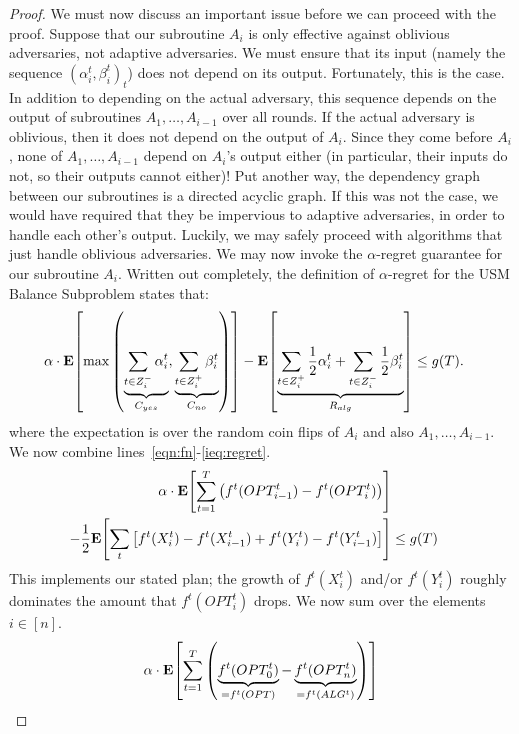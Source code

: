 \documentclass[final,12pt]{colt2018}
\newcommand{\BalanceSubproblem}{USM Balance Subproblem}
\newcommand{\Yes}[1][i]{Z^+_{#1}}
\newcommand{\No}[1][i]{Z^-_{#1}}
\newcommand{\RewardAlg}{R_{alg}}
\newcommand{\CostYes}{C_{yes}}
\newcommand{\CostNo}{C_{no}}
\newcommand{\expect}[2][]{\mathbf{E}\ifthenelse{\not\equal{}{#1}}{_{#1}}{}\!\left[#2\right]}
\begin{document}
\begin{proof}
  We must now discuss an important issue before we can proceed with the proof. Suppose that our subroutine $A_i$ is only effective against oblivious adversaries, not adaptive adversaries. We must ensure that its input (namely the sequence $(\alpha^t_i, \beta^t_i)_t$) does not depend on its output. Fortunately, this is the case. In addition to depending on the actual adversary, this sequence depends on the output of subroutines $A_1, \ldots, A_{i-1}$ over all rounds. If the actual adversary is oblivious, then it does not depend on the output of $A_i$. Since they come before $A_i$, none of $A_1, \ldots, A_{i-1}$ depend on $A_i$'s output either (in particular, their inputs do not, so their outputs cannot either)! Put another way, the dependency graph between our subroutines is a directed acyclic graph. If this was not the case, we would have required that they be impervious to adaptive adversaries, in order to handle each other's output. Luckily, we may safely proceed with algorithms that just handle oblivious adversaries. We may now invoke the $\alpha$-regret guarantee for our subroutine $A_i$. Written out completely, the definition of $\alpha$-regret for the \BalanceSubproblem{} states that:
  \begin{align}
    \alpha \cdot
      \expect{ \max
        \left(
          \underbrace{\sum_{t \in \No} \alpha^t_i}_{\CostYes},
          \underbrace{\sum_{t \in \Yes} \beta^t_i}_{\CostNo}
        \right)
      }
      - \expect{ \underbrace{\sum_{t \in \Yes} \frac12 \alpha^t_i + \sum_{t \in \No} \frac12 \beta^t_i}_{\RewardAlg} }
      &\le g(T). \label{ieq:regret}
  \end{align}
  where the expectation is over the random coin flips of $A_i$ and also $A_1, \ldots, A_{i-1}$. We now combine lines~\ref{eqn:fn}-\ref{ieq:regret}.
  \begin{align*}
    \alpha \cdot
      \expect{ \sum_{t=1}^T \left( f^t(OPT^t_{i-1}) - f^t(OPT^t_i) \right) } \\
      - \frac12 \expect{ \sum_t \left[ f^t(X^t_i) - f^t(X^t_{i-1}) + f^t(Y^t_i) - f^t(Y^t_{i-1}) \right] }
      &\le g(T)
  \end{align*}
  This implements our stated plan; the growth of $f^t(X^t_i)$ and/or $f^t(Y^t_i)$ roughly dominates the amount that $f^t(OPT^t_i)$ drops. We now sum over the elements $i \in [n]$.
  \begin{align*}
    \alpha \cdot
      \expect{
        \sum_{t=1}^T \left( \underbrace{f^t(OPT^t_0)}_{=f^t(OPT)}
          - \underbrace{f^t(OPT^t_n)}_{=f^t(ALG^t)} \right) } \\

\end{align*}
\end{proof}
\end{document}
